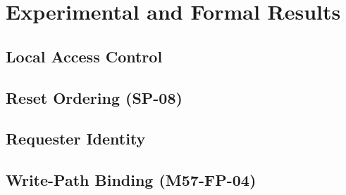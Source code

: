 \section{Experimental and Formal Results}
\label{sec:results}


\subsection{Local Access Control}

\subsection{Reset Ordering (SP-08)}




\subsection{Requester Identity}

\subsection{Write-Path Binding (M57-FP-04)}



